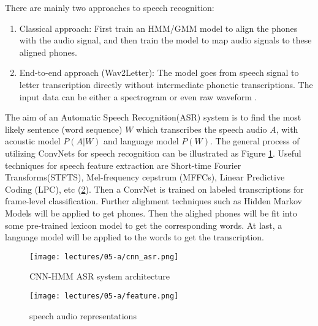 There are mainly two approaches to speech recognition:
\begin{enumerate}
    \item Classical approach: First train an HMM/GMM model to align the phones with the audio signal, and then train the model to map audio signals to these aligned phones.
    \item End-to-end approach (Wav2Letter): The model goes from speech signal to letter transcription directly without intermediate phonetic transcriptions. The input data can be either a spectrogram or even raw waveform \cite{Collobert2017Wav2LetterAE}.
\end{enumerate}
The aim of an Automatic Speech Recognition(ASR) system is to find the most likely sentence (word sequence) $W$ which transcribes the speech audio $A$, with acoustic model $P(A|W)$ and language model $P(W)$. The general process of utilizing ConvNets for speech recognition can be illustrated as Figure \ref{fig:cnn_asr}.
Useful techniques for speech feature extraction are Short-time Fourier Transforms(STFTS), Mel-frequency cepstrum (MFFCs), Linear Predictive Coding (LPC), etc (\ref{fig:feature}). Then a ConvNet is trained on labeled transcriptions for frame-level classification. Further alighment techniques such as Hidden Markov Models will be applied to get phones. Then the alighed phones will be fit into some pre-trained lexicon model to get the corresponding words. At last, a language model will be applied to the words to get the transcription. 
\begin{figure}[h]
    \centering
    \texttt{[image: lectures/05-a/cnn\_asr.png]}
    \caption{CNN-HMM ASR system architecture}
    \label{fig:cnn_asr}
\end{figure}
\begin{figure}[h]
    \centering
    \texttt{[image: lectures/05-a/feature.png]}
    \caption{speech audio representations}
    \label{fig:feature}
\end{figure}